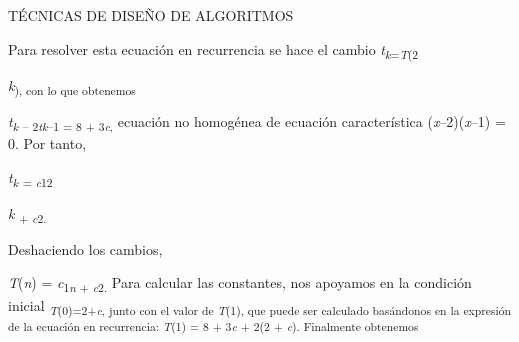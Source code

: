 \documentclass[12pt]{article}
\renewcommand{\_}{\kern-1.5pt\textunderscore\kern-1.5pt}
\begin{document}
\begin{adjustwidth}{0.58in}{0.57in}
{\fontsize{10pt}{12.0pt} {\fontsize{7pt}{8.4pt}\selectfont TÉCNICAS DE DISEÑO DE ALGORITMOS \par}\par}\par

\end{adjustwidth}

\begin{adjustwidth}{0.77in}{0.57in}
{\fontsize{10pt}{12.0pt}\selectfont Para resolver esta ecuación en recurrencia se hace el cambio \textit{t\textsubscript{k}}\textsubscript{=\textit{T}(2}{\fontsize{7pt}{8.4pt}\selectfont \textit{k}\textsubscript{), con lo que obtenemos }\par}\par}\par

\end{adjustwidth}

\begin{adjustwidth}{0.77in}{0.82in}
\begin{Center}
{\fontsize{10pt}{12.0pt}\selectfont \textit{t\textsubscript{k }}\textsubscript{– 2\textit{tk}–1 = 8 + 3\textit{c}, }ecuación no homogénea de ecuación característica (\textit{x}–2)(\textit{x}–1) = 0. Por tanto, \par}
\end{Center}\par

\end{adjustwidth}

\begin{adjustwidth}{0.77in}{2.74in}
{\fontsize{10pt}{12.0pt}\selectfont \textit{t\textsubscript{k }}\textsubscript{= \textit{c}12}{\fontsize{7pt}{8.4pt}\selectfont \textit{k }\textsubscript{+ \textit{c}2. }{\fontsize{10pt}{12.0pt}\selectfont Deshaciendo los cambios, \par}\par}\par}\par

\end{adjustwidth}

\begin{adjustwidth}{0.77in}{0.57in}
\begin{Center}
{\fontsize{10pt}{12.0pt}\selectfont \textit{T}(\textit{n}) = \textit{c}\textsubscript{1\textit{n }+ \textit{c}2. }Para calcular las constantes, nos apoyamos en la condición inicial \textit{\textsubscript{T}}\textsubscript{(0)=2+\textit{c}, junto con el valor de \textit{T}(1), que puede ser calculado basándonos en la expresión de la ecuación en recurrencia: \textit{T}(1) = 8 + 3\textit{c }+ 2(2 + \textit{c}). Finalmente obtenemos }\par}
\end{Center}\par

\end{adjustwidth}
\end{document}
